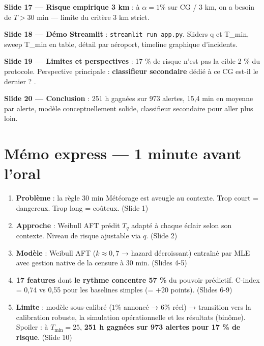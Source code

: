 \documentclass[11pt,a4paper]{article}
\begin{document}
\begin{tcolorbox}[colback=blue!4,colframe=blue!50!black,title=\textbf{Aperçu des slides 11-20 (pour préparer la transition)}]
\textbf{Slide 17 — Risque empirique 3 km} : à $\alpha = 1 \%$ sur CG / 3 km, on a besoin
de $T > 30$ min — limite du critère 3 km strict.

\textbf{Slide 18 — Démo Streamlit} : \texttt{streamlit run app.py}. Sliders q et T\_min,
sweep T\_min en table, détail par aéroport, timeline graphique d'incidents.

\textbf{Slide 19 — Limites et perspectives} : 17 \% de risque n'est pas la cible 2 \% du
protocole. Perspective principale : \textbf{classifieur secondaire} dédié à
\og ce CG est-il le dernier ? \fg{}.

\textbf{Slide 20 — Conclusion} : 251 h gagnées sur 973 alertes, 15,4 min en moyenne par
alerte, modèle conceptuellement solide, classifieur secondaire pour aller plus loin.
\end{tcolorbox}

\section*{Mémo express — 1 minute avant l'oral}

\begin{tcolorbox}[colback=red!4,colframe=red!50!black,title=\textbf{Les 5 phrases-clés (slides 1-10)}]
\begin{enumerate}
    \item \textbf{Problème} : la règle 30 min Météorage est aveugle au contexte. Trop court
    = dangereux. Trop long = coûteux. (Slide 1)
    \item \textbf{Approche} : Weibull AFT prédit $T_q$ adapté à chaque éclair selon son
    contexte. Niveau de risque ajustable via $q$. (Slide 2)
    \item \textbf{Modèle} : Weibull AFT ($k \approx 0{,}7$ → hazard décroissant) entraîné par
    MLE avec gestion native de la censure à 30 min. (Slides 4-5)
    \item \textbf{17 features} dont \textbf{le rythme concentre 57 \%} du pouvoir prédictif.
    C-index = 0,74 vs 0,55 pour les baselines simples (= $+ 20$ points). (Slides 6-9)
    \item \textbf{Limite} : modèle sous-calibré ($1 \%$ annoncé → $6 \%$ réel) → transition
    vers la calibration robuste, la simulation opérationnelle et les résultats (binôme).
    Spoiler : à $T_{\min} = 25$, \textbf{251 h gagnées sur 973 alertes pour 17 \% de risque}.
    (Slide 10)
\end{enumerate}
\end{tcolorbox}
\end{document}
